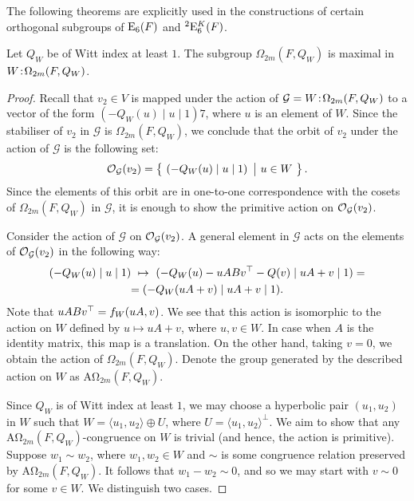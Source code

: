 The following theorems are explicitly used in the constructions of certain orthogonal subgroups
of $\mathord{\mathrm{E}}_6(F)$ and ${}^2\mathord{\mathrm{E}}_6^K(F)$. 

\begin{theorem}
	\label{theorem:A_omega_maximal}
	Let $Q_W$ be of Witt index at least $1$. The subgroup $\Omega_{2m}(F,Q_W)$ is maximal
	in $W\mathord{{\;\!{:}\;\!}}\Omega_{2m}(F,Q_W)$.
\end{theorem}

\begin{proof}
	Recall that $v_2 \in V$ is mapped under the action of 
    $\mathcal{G} = W\mathord{{\;\!{:}\;\!}}\Omega_{2m}(F,Q_W)$ to a vector of the
    form $(-Q_W(u) \mid u \mid 1)7$, where $u$ is an element of $W$. 
    Since the stabiliser of $v_2$ in $\mathcal{G}$ is $\Omega_{2m}(F,Q_W)$, 
    we conclude that 
    the orbit of $v_2$ under the action of $\mathcal{G}$ is the following set:
    \begin{equation*}
	\operatorname{\mathcal{O}}_{\mathcal{G}}(v_2) = \left\{\  \left( -Q_W(u) \mid  u \mid 1
	 \right)\ \big|\ u \in W \ \right\}.
    \end{equation*}
    Since the elements of this orbit are in one-to-one correspondence with the
    cosets of $\Omega_{2m}(F,Q_W)$ in $\mathcal{G}$, 
    it is enough to show the primitive
    action on $\operatorname{\mathcal{O}}_{\mathcal{G}}(v_2)$. 
    
    Consider the action of $\mathcal{G}$ on 
    $\operatorname{\mathcal{O}}_{\mathcal{G}}(v_2)$. A general element in $\mathcal{G}$ 
    acts on the elements of $\operatorname{\mathcal{O}}_{\mathcal{G}}(v_2)$ in the following way:
    \begin{multline*}
	( -Q_W(u) \mid  u \mid 1 ) \ \mapsto \ 
	( -Q_W(u) - uABv^\T - Q(v) \mid
	    uA + v \mid 1) = \\
	    = (-Q_W(uA + v) \mid uA + v \mid 1).
    \end{multline*}
    Note that $uABv^\top = f_W( uA, v )$. 
    We see that this action is isomorphic to the action on $W$ defined by
	$u \mapsto uA + v$,
    where $u,v \in W$. In case when $A$ is the identity matrix, this map
    is a translation. On the other hand, taking $v = 0$, we obtain the
    action of $\Omega_{2m}(F,Q_W)$. 
    Denote the group generated by the described action on $W$ as
    $\mathrm{A\Omega}_{2m}(F,Q_W)$.
    
    Since $Q_W$ is of Witt index at least $1$, we may choose a hyperbolic pair 
    $(u_1,u_2)$ in $W$ such that $W = \langle u_1, u_2 \rangle \oplus U$, where 
    $U = \langle u_1, u_2 \rangle^{\perp}$. We aim to show that any 
    $\mathrm{A\Omega}_{2m}(F,Q_W)$-congruence on $W$ is trivial (and hence, the 
    action is primitive). Suppose $w_1 \sim w_2$, where $w_1,w_2 \in W$ and 
    $\sim$ is some congruence relation preserved by $\mathrm{A\Omega}_{2m}(F,Q_W)$.
    It follows that $w_1 - w_2 \sim 0$, and so we may start with $v \sim 0$ for some
    $v \in W$. We distinguish two cases.
    

\end{proof}
